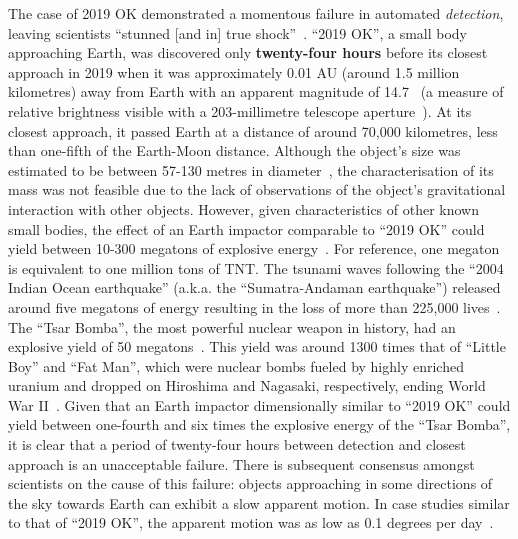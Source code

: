 The case of 2019 OK demonstrated a momentous failure in automated \textit{detection}, leaving scientists ``stunned [and in] true shock''~\cite{chiu_2019}. ``2019 OK'', a small body approaching Earth, was discovered only \textbf{twenty-four hours} before its closest approach in 2019 when it was approximately 0.01 AU (around 1.5 million kilometres) away from Earth with an apparent magnitude of 14.7~\cite{IAU2019OK} (a measure of relative brightness visible with a 203-millimetre telescope aperture~\cite[p.~24]{North2014}). At its closest approach, it passed Earth at a distance of around 70,000 kilometres, less than one-fifth of the Earth-Moon distance. Although the object's size was estimated to be between 57-130 metres in diameter~\cite{NASA2019}, the characterisation of its mass was not feasible due to the lack of observations of the object's gravitational interaction with other objects. However, given characteristics of other known small bodies, the effect of an Earth impactor comparable to ``2019 OK'' could yield between 10-300 megatons of explosive energy~\cite{Cellino1999, Rumpf2017}. For reference, one megaton is equivalent to one million tons of \gls{TNT}. The tsunami waves following the ``2004 Indian Ocean earthquake'' (a.k.a. the ``Sumatra-Andaman earthquake'') released around five megatons of energy resulting in the loss of more than 225,000 lives~\cite{Nirupama2006}. The ``Tsar Bomba'', the most powerful nuclear weapon in history, had an explosive yield of 50 megatons~\cite{Khan2020}. This yield was around 1300 times that of ``Little Boy'' and ``Fat Man'', which were nuclear bombs fueled by highly enriched uranium and dropped on Hiroshima and Nagasaki, respectively, ending World War II~\cite{osti_1489669}. Given that an Earth impactor dimensionally similar to ``2019 OK'' could yield between one-fourth and six times the explosive energy of the ``Tsar Bomba'', it is clear that a period of twenty-four hours between detection and closest approach is an unacceptable failure. There is subsequent consensus amongst scientists on the cause of this failure: objects approaching in some directions of the sky towards Earth can exhibit a slow apparent motion. In case studies similar to that of ``2019 OK'', the apparent motion was as low as 0.1 degrees per day~\cite{Wainscoat2022}. 

